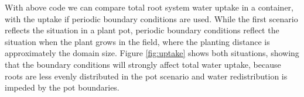 
With above code we can compare total root system water uptake in a container, with the uptake if periodic boundary conditions are used. While the first scenario reflects the situation in a plant pot, periodic boundary conditions reflect the situation when the plant grows in the field, where the planting distance is approximately the domain size. Figure \ref{fig:uptake} shows both situations, showing that the boundary conditions will strongly affect total water uptake, because roots are less evenly distributed in the pot scenario and water redistribution is impeded by the pot boundaries.

